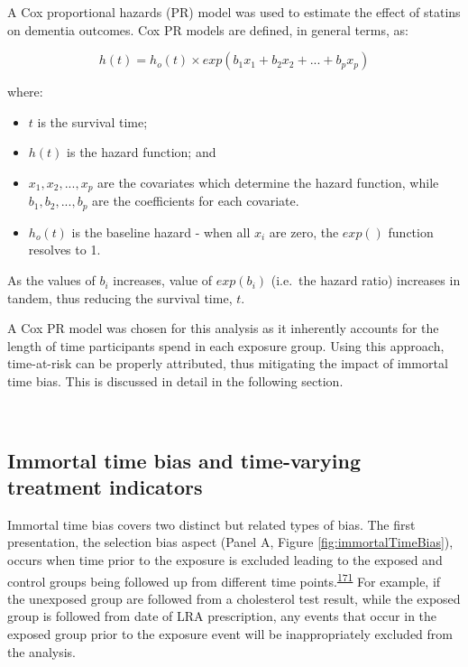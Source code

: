 \documentclass[a4paper, twoside]{templates/ociamthesis}
\providecommand{\tightlist}{%
  \setlength{\itemsep}{0pt}\setlength{\parskip}{0pt}}
\begin{document}
A Cox proportional hazards (PR) model was used to estimate the effect of statins on dementia outcomes. Cox PR models are defined, in general terms, as:

\begin{equation}
  h(t) = h_o(t) \times exp(b_1x_1 + b_2x_2 + ... +b_px_p)
  \label{eq:cox-model}
\end{equation}

where:

\begin{itemize}
\tightlist
\item
  \(t\) is the survival time;
\item
  \(h(t)\) is the hazard function; and
\item
  \(x_1,x_2,...,x_p\) are the covariates which determine the hazard function, while \(b_1,b_2,...,b_p\) are the coefficients for each covariate.
\item
  \(h_o(t)\) is the baseline hazard - when all \(x_i\) are zero, the \(exp()\) function resolves to 1.
\end{itemize}

As the values of \(b_i\) increases, value of \(exp(b_i)\) (i.e.~the hazard ratio) increases in tandem, thus reducing the survival time, \(t\).

A Cox PR model was chosen for this analysis as it inherently accounts for the length of time participants spend in each exposure group. Using this approach, time-at-risk can be properly attributed, thus mitigating the impact of immortal time bias. This is discussed in detail in the following section.

~

\hypertarget{cprd-immortal-time-bias}{%
\subsection{Immortal time bias and time-varying treatment indicators}\label{cprd-immortal-time-bias}}

Immortal time bias covers two distinct but related types of bias. The first presentation, the selection bias aspect (Panel A, Figure \ref{fig:immortalTimeBias}), occurs when time prior to the exposure is excluded leading to the exposed and control groups being followed up from different time points.\textsuperscript{\protect\hyperlink{ref-levesque2010}{171}} For example, if the unexposed group are followed from a cholesterol test result, while the exposed group is followed from date of LRA prescription, any events that occur in the exposed group prior to the exposure event will be inappropriately excluded from the analysis.
\end{document}
